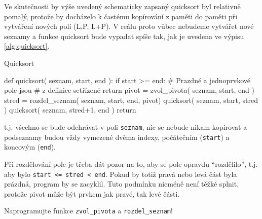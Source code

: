 \begin{remark} Ve skutečnosti by výše uvedený schematicky zapsaný quicksort byl relativně pomalý,
protože by docházelo k častému kopírování z paměti do paměti při vytváření nových polí (L,P, L+P).
V reálu proto vůbec nebudeme vytvářet nové seznamy a funkce quicksort bude vypadat spíše tak, jak je uvedena ve výpisu \ref{alg:quicksort}.

\begin{program}\caption{Quicksort}\label{alg:quicksort}
\begin{python}
def quicksort( seznam, start, end ):
    if start >= end:
        # Prazdné a jednoprvkové pole jsou
        # z definice setřízené
        return
    pivot = zvol_pivota( seznam, start, end )
    stred = rozdel_seznam( seznam, start, end, pivot)
    quicksort( seznam, start, stred )
    quicksort( seznam, stred+1, end )
    return
\end{python}
\end{program}

t.j. všechno se bude odehrávat v poli {\tt seznam}, nic se nebude nikam kopírovat a podseznamy budou
vždy vymezené dvěma indexy, počátečním ({\tt start}) a koncovým ({\tt end}).
\end{remark}

\begin{remark} Při rozdělování pole je třeba dát pozor na to, aby se pole opravdu ``rozdělilo'', t.j.
aby bylo {\tt start <= stred < end}. Pokud by totiž pravá nebo levá část byla prázdná, program
by se zacyklil. Tuto podmínku nicméně není těžké splnit, protože pivot může být prvkem jak pravé,
tak levé části.
\end{remark}

\begin{cviceni} Naprogramujte funkce {\tt zvol\_pivota} a {\tt rozdel\_seznam}!
\end{cviceni}


